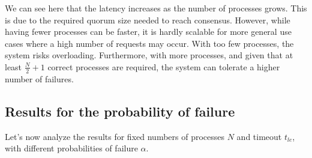 \documentclass{article}
\begin{document}
We can see here that the latency increases as the number of processes grows. This is due to the required quorum size needed to reach consensus. However, while having fewer processes can be faster, it is hardly scalable for more general use cases where a high number of requests may occur. With too few processes, the system risks overloading. Furthermore, with more processes, and given that at least
$ \frac{N}{2} + 1$ correct processes are required, the system can tolerate a higher number of failures.

\newpage

\subsection{Results for the probability of failure}
Let's now analyze the results for fixed numbers of processes $N$ and timeout $t_{le}$, with different probabilities of failure $\alpha$.
\end{document}
